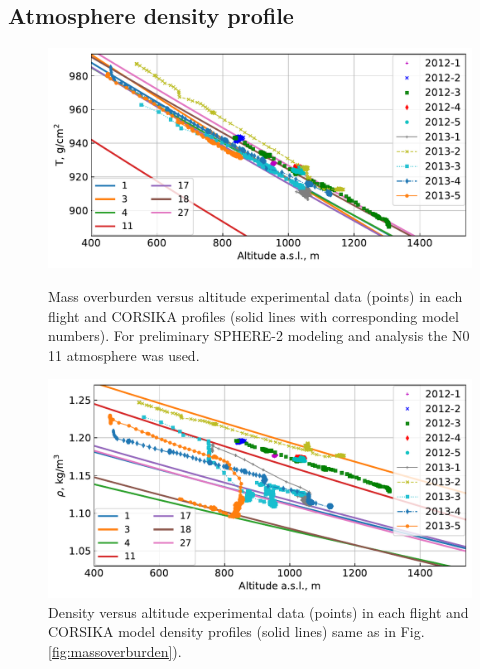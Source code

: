 \documentclass[final,5p,times,twocolumn]{elsarticle}
\begin{document}
\subsection{Atmosphere density profile}
\label{sect:atmosphere-profile}
\begin{figure}[bt]
\centering
\begin{minipage}[t]{0.48\textwidth}
    \includegraphics[width=\textwidth]{figs/atmosphere_T.pdf}
    \vspace{-1.0pc}
    \caption{Mass overburden versus altitude experimental data (points) in each flight and CORSIKA profiles (solid lines with corresponding model numbers). For preliminary SPHERE-2 modeling and analysis the N0 11 atmosphere was used.}
\label{fig:massoverburden}
\end{minipage}
\vfill
\vspace{1pc}
\begin{minipage}[t]{0.48\textwidth}
    \includegraphics[width=\textwidth]{figs/atmosphere_rho.pdf}
    \vspace{-1.0pc}
    \caption{Density versus altitude experimental data (points) in each flight and CORSIKA model density profiles (solid lines) same as in Fig. \ref{fig:massoverburden}).}
\label{fig:density}
\end{minipage}
\end{figure}
\end{document}
